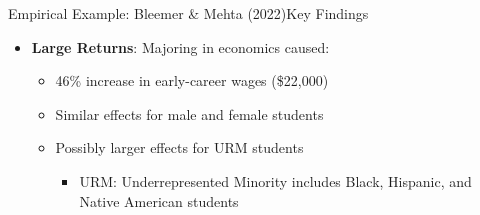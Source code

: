 \documentclass[hyperref={pdfpagelabels=false}]{beamer}
\begin{document}
\begin{frame}{Empirical Example: Bleemer \& Mehta (2022)}{Key Findings}
	\begin{itemize}
		\item \textbf{Large Returns}: Majoring in economics caused:
							\vspace{0.2cm}
		\begin{itemize}
			\item 46\% increase in early-career wages (\$22,000)
								\vspace{0.2cm}
			\item Similar effects for male and female students
								\vspace{0.2cm}
			\item Possibly larger effects for URM students
											\vspace{0.2cm}
					\begin{itemize}
			\item URM: Underrepresented Minority includes Black, Hispanic, and Native American students
					\end{itemize}
		\end{itemize}
		
		\vspace{0.2cm}
	\end{itemize}
\end{frame}
\end{document}
